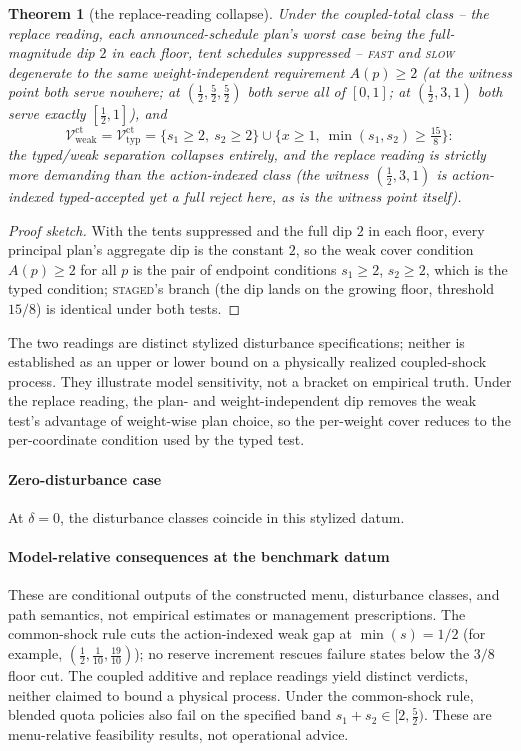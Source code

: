 \documentclass[preprint,11pt,authoryear]{elsarticle}
\newtheorem{theorem}{Theorem}
\theoremstyle{remark}
\newcommand{\Vtyp}{\mathcal{V}_{\mathrm{typ}}}
\newcommand{\Vweak}{\mathcal{V}_{\mathrm{weak}}}
\newcommand{\act}[1]{\textsc{#1}}
\begin{document}
\begin{theorem}[the replace-reading collapse]\label{thm:replace}
Under the coupled-total class -- the replace reading, each announced-schedule plan's worst case being the full-magnitude dip $2$ in each floor, tent schedules suppressed -- \act{fast} and \act{slow} degenerate to the same weight-independent requirement $A(p)\ge2$ (at the witness point both serve nowhere; at $(\tfrac12,\tfrac52,\tfrac52)$ both serve all of $[0,1]$; at $(\tfrac12,3,1)$ both serve exactly $[\tfrac12,1]$), and
\[
\Vweak^{\mathrm{ct}}=\Vtyp^{\mathrm{ct}}=\{s_1\ge2,\ s_2\ge2\}\cup\{x\ge1,\ \min(s_1,s_2)\ge\tfrac{15}8\}:
\]
the typed/weak separation collapses entirely, and the replace reading is strictly more demanding than the action-indexed class (the witness $(\tfrac12,3,1)$ is action-indexed typed-accepted yet a full reject here, as is the witness point itself).
\end{theorem}
\begin{proof}[Proof sketch]
With the tents suppressed and the full dip $2$ in each floor, every principal plan's aggregate dip is the constant $2$, so the weak cover condition $A(p)\ge2$ for all $p$ is the pair of endpoint conditions $s_1\ge2$, $s_2\ge2$, which is the typed condition; \act{staged}'s branch (the dip lands on the growing floor, threshold $15/8$) is identical under both tests.
\end{proof}

The two readings are distinct stylized disturbance specifications; neither is established as an upper or lower bound on a physically realized coupled-shock process. They illustrate model sensitivity, not a bracket on empirical truth. Under the replace reading, the plan- and weight-independent dip removes the weak test's advantage of weight-wise plan choice, so the per-weight cover reduces to the per-coordinate condition used by the typed test.

\paragraph{Zero-disturbance case} At $\delta=0$, the disturbance classes coincide in this stylized datum.

\paragraph{Model-relative consequences at the benchmark datum} These are conditional outputs of the constructed menu, disturbance classes, and path semantics, not empirical estimates or management prescriptions. The common-shock rule cuts the action-indexed weak gap at $\min(s)=1/2$ (for example, $(\tfrac12,\tfrac1{10},\tfrac{19}{10})$); no reserve increment rescues failure states below the $3/8$ floor cut. The coupled additive and replace readings yield distinct verdicts, neither claimed to bound a physical process. Under the common-shock rule, blended quota policies also fail on the specified band $s_1+s_2\in[2,\tfrac52)$. These are menu-relative feasibility results, not operational advice.
\end{document}
